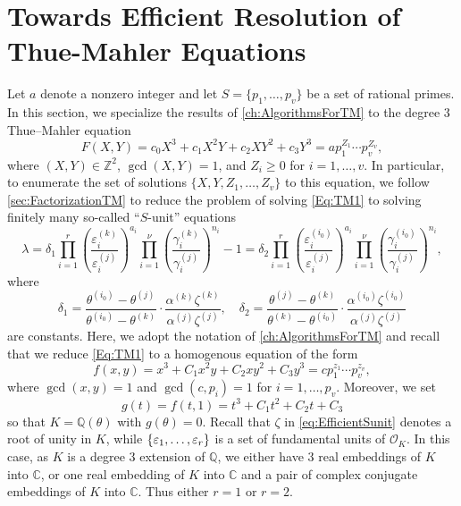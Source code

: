 
\chapter{Towards Efficient Resolution of Thue-Mahler Equations}
\label{ch:EfficientTMSolver}

Let $a$ denote a nonzero integer and let $S=\{p_1,\dotsc,p_v\}$ be a set of rational primes. In this section, we specialize the results of \autoref{ch:AlgorithmsForTM} to the degree $3$ Thue--Mahler equation
\begin{equation} \label{Eq:TM1}
F(X,Y) = c_0 X^3 + c_1 X^{2}Y + c_2XY^2 + c_3Y^3 = a p_1^{Z_1}\cdots p_v^{Z_v},
\end{equation}
where $(X,Y) \in \mathbb{Z}^2$, $\gcd(X,Y)=1$, and $Z_i \geq 0$ for $i = 1, \dots, v$. In particular, to enumerate the set of solutions $\{X,Y, Z_1, \dots, Z_v\}$ to this equation, we follow \autoref{sec:FactorizationTM} to reduce the problem of solving \eqref{Eq:TM1} to solving finitely many so-called ``$S$-unit'' equations
\begin{equation} \label{eq:EfficientSunit}
\lambda = \delta_1 \prod_{i = 1}^r\left( \frac{\varepsilon_i^{(k)}}{\varepsilon_i^{(j)}}\right)^{a_i}\prod_{i = 1}^{\nu} \left( \frac{\gamma_i^{(k)}}{\gamma_i^{(j)}}\right)^{n_i} - 1 = \delta_2 \prod_{i = 1}^{r}\left( \frac{\varepsilon_i^{(i_0)}}{\varepsilon_i^{(j)}}\right)^{a_i} \prod_{i = 1}^{\nu} \left( \frac{\gamma_i^{(i_0)}}{\gamma_i^{(j)}}\right)^{n_i},
\end{equation}
where
\[\delta_1 = \frac{\theta^{(i_0)} - \theta^{(j)}}{\theta^{(i_0)} - \theta^{(k)}}\cdot\frac{\alpha^{(k)}\zeta^{(k)}}{\alpha^{(j)}\zeta^{(j)}}, \quad \delta_2 = \frac{\theta^{(j)} - \theta^{(k)}}{\theta^{(k)} - \theta^{(i_0)}}\cdot \frac{\alpha^{(i_0)}\zeta^{(i_0)}}{\alpha^{(j)}\zeta^{(j)}}\]
are constants. Here, we adopt the notation of \autoref{ch:AlgorithmsForTM} and recall that we reduce \eqref{Eq:TM1} to a homogenous equation of the form
\begin{equation} \label{eq:Efficientpoly}
f(x,y) = x^3 + C_1x^2y + C_2xy^2 + C_3y^3 = cp_1^{z_1}\cdots p_v^{z_v},
\end{equation}
where $\gcd(x,y) = 1$ and $\gcd(c,p_i) = 1$ for $i = 1, \dots, p_v$. Moreover, we set
\begin{equation} \label{eq:Efficientg}
g(t) = f(t,1) = t^3 + C_1t^2 + C_2t + C_3
\end{equation}
so that $K = \mathbb{Q}(\theta)$ with $g(\theta) = 0$. Recall that $\zeta$ in \eqref{eq:EfficientSunit} denotes a root of unity in $K$, while $\{\varepsilon_1, \dots, \varepsilon_r\}$ is a set of fundamental units of $\mathcal{O}_K$. In this case, as $K$ is a degree $3$ extension of $\mathbb{Q}$, we either have $3$ real embeddings of $K$ into $\mathbb{C}$, or one real embedding of $K$ into $\mathbb{C}$ and a pair of complex conjugate embeddings of $K$ into $\mathbb{C}$. Thus either $r = 1$ or $r = 2$. 

